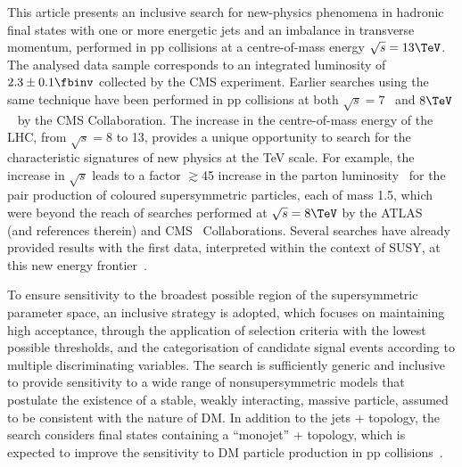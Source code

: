 This article presents an inclusive search for new-physics phenomena in
hadronic final states with one or more energetic jets and an imbalance
in transverse momentum, performed in pp collisions at a centre-of-mass
energy $\sqrt{s} = 13\TeV$. The analysed data sample corresponds to an
integrated luminosity of $2.3 \pm 0.1 \fbinv$ %
collected by the CMS experiment. Earlier searches using the same
technique have been performed in pp collisions at both $\sqrt{s} =
7$~\cite{RA1Paper, RA1Paper2011, RA1Paper2011FULL} and
$8\TeV$~\cite{RA1Paper2012, RA1Parked} by the CMS
Collaboration. 
The increase in the centre-of-mass energy of the LHC, from $\sqrt{s} =
8$ to 13\TeV, provides a unique opportunity to search for the
characteristic signatures of new physics at the TeV scale. For
example, the increase in $\sqrt{s}$ leads to a factor $\gtrsim$45
increase in the parton luminosity~\cite{Martin:2009iq} for the pair
production of coloured supersymmetric particles, each of mass 1.5\TeV,
which were beyond the reach of searches performed at $\sqrt{s} =
8\TeV$ by the ATLAS~\cite{Aad:2015iea, Aad:2015pfx} (and references
therein) and CMS~\cite{CMS:2014dpa, Khachatryan:2015vra,
  Khachatryan:2016oia, Chatrchyan:2013wxa, Chatrchyan:2014lfa,
  Khachatryan:2015pwa, Khachatryan:2015wza, Khachatryan:2016zcu}
Collaborations. Several searches have already provided results with
the first data, interpreted within the context of SUSY, at this new
energy frontier~\cite{Aad:2016jxj, Aaboud:2016tnv, Aaboud:2016zdn,
  Aad:2016eki, Aaboud:2016nwl, Khachatryan:2016kdk, cms-13}.

To ensure sensitivity to the broadest possible region of the
supersymmetric parameter space, an inclusive strategy is adopted,
which focuses on maintaining high acceptance, through the application
of selection criteria with the lowest possible thresholds, and the
categorisation of candidate signal events according to multiple
discriminating variables. 
The search is sufficiently generic and inclusive to provide
sensitivity to a wide range of nonsupersymmetric models that postulate
the existence of a stable, weakly interacting, massive particle,
assumed to be consistent with the nature of DM. In addition to the
jets + \ptvecmiss topology, the search considers final states
containing a ``monojet'' + \ptvecmiss topology, which is expected to
improve the sensitivity to DM particle production in pp
collisions~\cite{Fox:2012ee, Buchmueller:2015eea}.

